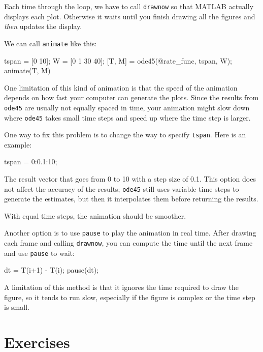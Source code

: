 \documentclass[
]{book}
\numberwithin{Answer}{chapter}
\numberwithin{Exercise}{chapter}
\begin{document}
Each time through the loop, we have to call {\tt drawnow} so
that MATLAB actually displays each plot.  Otherwise it waits
until you finish drawing all the figures and {\em then} updates
the display.

We can call {\tt animate} like this:

\begin{code}
    tspan = [0 10];
    W = [0 1 30 40];
    [T, M] = ode45(@rate_func, tspan, W);
    animate(T, M)
\end{code}

One limitation of this kind of animation is that the speed
of the animation depends on how fast your computer can generate
the plots.  Since the results from {\tt ode45} are usually not
equally spaced in time, your animation might slow down where
{\tt ode45} takes small time steps and speed up where the time
step is larger.


One way to fix this problem is to change the way to specify {\tt tspan}.
Here is an example:

\begin{code}
    tspan = 0:0.1:10;
\end{code}

The result vector that goes from 0 to 10 with a
step size of 0.1.  This option does not affect the accuracy of the results; {\tt ode45} still uses variable time steps to generate the estimates, but then it interpolates them before returning the results.


With equal time steps, the animation should be smoother.

Another option is to use {\tt pause} to play the animation in
real time.  After drawing each frame and calling
{\tt drawnow}, you can compute the time
until the next frame and use {\tt pause} to wait:

\begin{code}
    dt = T(i+1) - T(i);
    pause(dt);
\end{code}

A limitation of this method is that it ignores the time required to
draw the figure, so it tends to run slow, especially if the figure is
complex or the time step is small.


\section{Exercises}
\end{document}

